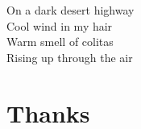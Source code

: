 
\begin{savequote}[90mm]
On a dark desert highway \\
Cool wind in my hair \\
Warm smell of colitas \\
Rising up through the air
\end{savequote}

\chapter*{Thanks} 
\thispagestyle{fancy}





\lipsum[1-5] 